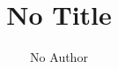 \documentclass[letterpaper,twoside,11pt]{book}
\title{No Title}
\author{No Author}
\date{}
\begin{document}
\nocite{*}
{\small
\printbibliography
}
\end{document}
